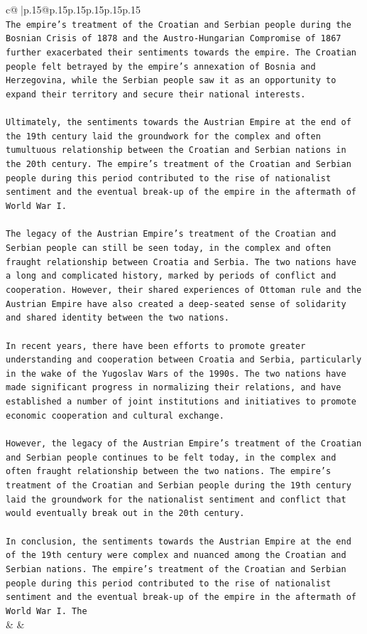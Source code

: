 \documentclass{article}
\begin{document}
{\begin{supertabular}{c@{$\;$}|p{.15\linewidth}@{}p{.15\linewidth}p{.15\linewidth}p{.15\linewidth}p{.15\linewidth}p{.15\linewidth}}
{{{\\ 
\texttt{The empire's treatment of the Croatian and Serbian people during the Bosnian Crisis of 1878 and the Austro{-}Hungarian Compromise of 1867 further exacerbated their sentiments towards the empire. The Croatian people felt betrayed by the empire's annexation of Bosnia and Herzegovina, while the Serbian people saw it as an opportunity to expand their territory and secure their national interests.} \\
\\ 
\texttt{Ultimately, the sentiments towards the Austrian Empire at the end of the 19th century laid the groundwork for the complex and often tumultuous relationship between the Croatian and Serbian nations in the 20th century. The empire's treatment of the Croatian and Serbian people during this period contributed to the rise of nationalist sentiment and the eventual break{-}up of the empire in the aftermath of World War I.} \\
\\ 
\texttt{The legacy of the Austrian Empire's treatment of the Croatian and Serbian people can still be seen today, in the complex and often fraught relationship between Croatia and Serbia. The two nations have a long and complicated history, marked by periods of conflict and cooperation. However, their shared experiences of Ottoman rule and the Austrian Empire have also created a deep{-}seated sense of solidarity and shared identity between the two nations.} \\
\\ 
\texttt{In recent years, there have been efforts to promote greater understanding and cooperation between Croatia and Serbia, particularly in the wake of the Yugoslav Wars of the 1990s. The two nations have made significant progress in normalizing their relations, and have established a number of joint institutions and initiatives to promote economic cooperation and cultural exchange.} \\
\\ 
\texttt{However, the legacy of the Austrian Empire's treatment of the Croatian and Serbian people continues to be felt today, in the complex and often fraught relationship between the two nations. The empire's treatment of the Croatian and Serbian people during the 19th century laid the groundwork for the nationalist sentiment and conflict that would eventually break out in the 20th century.} \\
\\ 
\texttt{In conclusion, the sentiments towards the Austrian Empire at the end of the 19th century were complex and nuanced among the Croatian and Serbian nations. The empire's treatment of the Croatian and Serbian people during this period contributed to the rise of nationalist sentiment and the eventual break{-}up of the empire in the aftermath of World War I. The} \\
            }
        }
    }
    & & \\ \\


\end{supertabular}}
\end{document}
